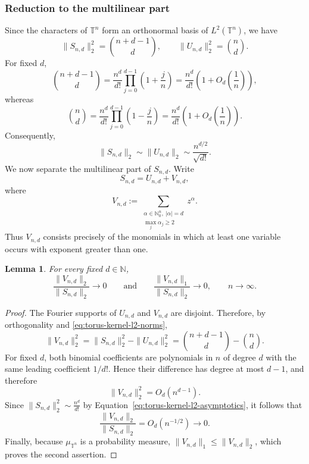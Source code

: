 \documentclass[11pt,showkeys]{amsart}
\newtheorem{lemma}[theorem]{Lemma}
\begin{document}
\subsubsection{Reduction to the multilinear part}

Since the characters of \(\mathbb T^n\) form an orthonormal basis of
\(L^2(\mathbb T^n)\), we have
\begin{equation}
\label{eq:torus-kernel-l2-norms}
    \|S_{n,d}\|_2^2
    =
    \binom{n+d-1}{d},
    \qquad
    \|U_{n,d}\|_2^2
    =
    \binom nd.
\end{equation}
For fixed \(d\),
\begin{equation} \label{DIMO1}
    \binom{n+d-1}{d}
    =
    \frac{n^d}{d!}
    \prod_{j=0}^{d-1}
    \left(1+\frac{j}{n}\right)
    =
    \frac{n^d}{d!}
    \left(1+O_d\left(\frac1n\right)\right),
\end{equation}
whereas
\begin{equation} \label{DIMO2}
    \binom nd
    =
    \frac{n^d}{d!}
    \prod_{j=0}^{d-1}
    \left(1-\frac{j}{n}\right)
    =
    \frac{n^d}{d!}
    \left(1+O_d\left(\frac1n\right)\right).
\end{equation}
Consequently,
\begin{equation}
\label{eq:torus-kernel-l2-asymptotics}
    \|S_{n,d}\|_2
    \sim
    \|U_{n,d}\|_2
    \sim
    \frac{n^{d/2}}{\sqrt{d!}}.
\end{equation}
We now separate the multilinear part of \(S_{n,d}\). Write
\[
    S_{n,d}=U_{n,d}+V_{n,d},
\]
where
\[
    V_{n,d}
    :=
    \sum_{\substack{
        \alpha\in\mathbb N_0^n,\ |\alpha|=d\\
        \max_j\alpha_j\geq 2
    }}
    z^\alpha.
\]
Thus \(V_{n,d}\) consists precisely of the monomials in which at least one
variable occurs with exponent greater than one.

\begin{lemma}
\label{lem:torus-remainder}
For every fixed \(d\in\mathbb N\),
\[
    \frac{\|V_{n,d}\|_2}{\|S_{n,d}\|_2}
    \longrightarrow 0
    \qquad\text{and}\qquad
    \frac{\|V_{n,d}\|_1}{\|S_{n,d}\|_2}
    \longrightarrow 0,
    \qquad n\to\infty.
\]
\end{lemma}

\begin{proof}
The Fourier supports of \(U_{n,d}\) and \(V_{n,d}\) are disjoint.
Therefore, by orthogonality and
\eqref{eq:torus-kernel-l2-norms},
\[
    \|V_{n,d}\|_2^2
    =
    \|S_{n,d}\|_2^2-\|U_{n,d}\|_2^2
    =
    \binom{n+d-1}{d}-\binom nd.
\]
For fixed \(d\), both binomial coefficients are polynomials in \(n\) of
degree \(d\) with the same leading coefficient \(1/d!\). Hence their
difference has degree at most \(d-1\), and therefore
\[
    \|V_{n,d}\|_2^2=O_d(n^{d-1}).
\]
Since
\(
    \|S_{n,d}\|_2^2
    \sim
    \frac{n^d}{d!}
\)
by Equation~\eqref{eq:torus-kernel-l2-asymptotics},
it follows that
\[
    \frac{\|V_{n,d}\|_2}{\|S_{n,d}\|_2}
    =
    O_d(n^{-1/2})
    \longrightarrow 0.
\]
Finally, because \(\mu_{\mathbb T^n}\) is a probability measure,
\(\|V_{n,d}\|_1\leq \|V_{n,d}\|_2\), which proves the second assertion.
\end{proof}
\end{document}
